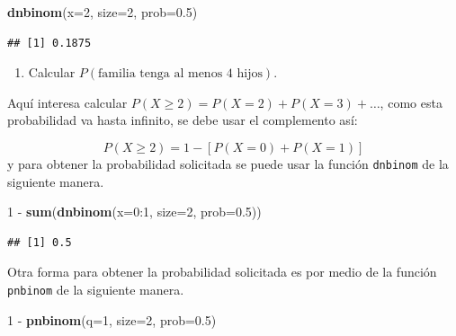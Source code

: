 \documentclass[10pt,]{krantz}
\makeatletter
\newenvironment{Shaded}{\begin{snugshade}}{\end{snugshade}}
\newcommand{\KeywordTok}[1]{\textcolor[rgb]{0.13,0.29,0.53}{\textbf{{#1}}}}
\newcommand{\DataTypeTok}[1]{\textcolor[rgb]{0.13,0.29,0.53}{{#1}}}
\newcommand{\DecValTok}[1]{\textcolor[rgb]{0.00,0.00,0.81}{{#1}}}
\newcommand{\FloatTok}[1]{\textcolor[rgb]{0.00,0.00,0.81}{{#1}}}
\newcommand{\StringTok}[1]{\textcolor[rgb]{0.31,0.60,0.02}{{#1}}}
\newcommand{\NormalTok}[1]{{#1}}
\providecommand{\tightlist}{%
  \setlength{\itemsep}{0pt}\setlength{\parskip}{0pt}}
\newenvironment{kframe}{%
\medskip{}
\setlength{\fboxsep}{.8em}
 \def\at@end@of@kframe{}%
 \ifinner\ifhmode%
  \def\at@end@of@kframe{\end{minipage}}%
  \begin{minipage}{\columnwidth}%
 \fi\fi%
 \def\FrameCommand##1{\hskip\@totalleftmargin \hskip-\fboxsep
 \colorbox{shadecolor}{##1}\hskip-\fboxsep
     \hskip-\linewidth \hskip-\@totalleftmargin \hskip\columnwidth}%
 \MakeFramed {\advance\hsize-\width
   \@totalleftmargin\z@ \linewidth\hsize
   \@setminipage}}%
 {\par\unskip\endMakeFramed%
 \at@end@of@kframe}
\renewenvironment{Shaded}{\begin{kframe}}{\end{kframe}}
\makeatother
\begin{document}
\begin{Shaded}
\begin{Highlighting}[]
\KeywordTok{dnbinom}\NormalTok{(}\DataTypeTok{x=}\DecValTok{2}\NormalTok{, }\DataTypeTok{size=}\DecValTok{2}\NormalTok{, }\DataTypeTok{prob=}\FloatTok{0.5}\NormalTok{)}
\end{Highlighting}
\end{Shaded}

\begin{verbatim}
## [1] 0.1875
\end{verbatim}

\begin{enumerate}
\def\labelenumi{\arabic{enumi})}
\setcounter{enumi}{1}
\tightlist
\item
  Calcular \(P(\text{familia tenga al menos 4 hijos})\).
\end{enumerate}

Aquí interesa calcular \(P(X \geq 2)=P(X=2)+P(X=3)+\ldots\), como esta
probabilidad va hasta infinito, se debe usar el complemento así:

\[P(X \geq 2) = 1 - [P(X=0)+P(X=1)]\] y para obtener la probabilidad
solicitada se puede usar la función \texttt{dnbinom} de la siguiente
manera.

\begin{Shaded}
\begin{Highlighting}[]
\DecValTok{1} \NormalTok{-}\StringTok{ }\KeywordTok{sum}\NormalTok{(}\KeywordTok{dnbinom}\NormalTok{(}\DataTypeTok{x=}\DecValTok{0}\NormalTok{:}\DecValTok{1}\NormalTok{, }\DataTypeTok{size=}\DecValTok{2}\NormalTok{, }\DataTypeTok{prob=}\FloatTok{0.5}\NormalTok{))}
\end{Highlighting}
\end{Shaded}

\begin{verbatim}
## [1] 0.5
\end{verbatim}

Otra forma para obtener la probabilidad solicitada es por medio de la
función \texttt{pnbinom} de la siguiente manera.

\begin{Shaded}
\begin{Highlighting}[]
\DecValTok{1} \NormalTok{-}\StringTok{ }\KeywordTok{pnbinom}\NormalTok{(}\DataTypeTok{q=}\DecValTok{1}\NormalTok{, }\DataTypeTok{size=}\DecValTok{2}\NormalTok{, }\DataTypeTok{prob=}\FloatTok{0.5}\NormalTok{)}
\end{Highlighting}
\end{Shaded}
\end{document}
